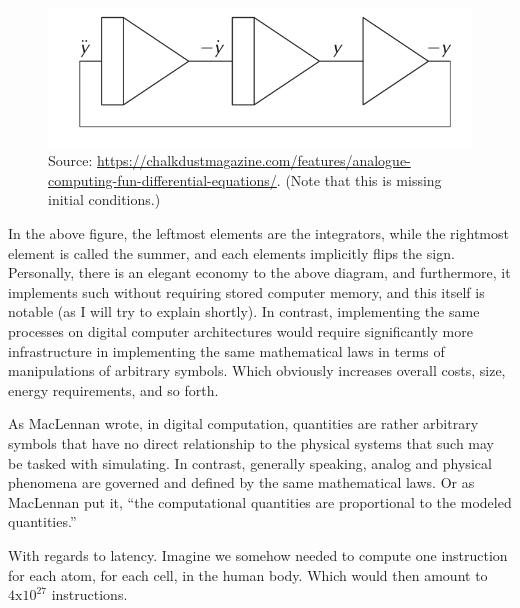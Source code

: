 \begin{figure}[H]
    \centering
    \includegraphics[width=0.6\linewidth]{../assets/analogue-computing-fun-differential-equations.png}
    \caption{Source: \url{https://chalkdustmagazine.com/features/analogue-computing-fun-differential-equations/}. (Note that this is missing initial conditions.)}
    \label{Image Label}
\end{figure}

In the above figure, the leftmost elements are the integrators, while the rightmost element is called the summer, and each elements implicitly flips the sign. Personally, there is an elegant economy to the above diagram, and furthermore, it implements such without requiring stored computer memory, and this itself is notable (as I will try to explain shortly). In contrast, implementing the same processes on digital computer architectures would require significantly more infrastructure in implementing the same mathematical laws in terms of manipulations of arbitrary symbols. Which obviously increases overall costs, size, energy requirements, and so forth.

As MacLennan wrote, in digital computation, quantities are rather arbitrary symbols that have no direct relationship to the physical systems that such may be tasked with simulating. In contrast, generally speaking, analog and physical phenomena are governed and defined by the same mathematical laws. Or as MacLennan put it, ``the computational quantities are proportional to the modeled quantities.''

With regards to latency. Imagine we somehow needed to compute one instruction for each atom, for each cell, in the human body. Which would then amount to $4 \mathrm{x} 10^{27}$ instructions.


